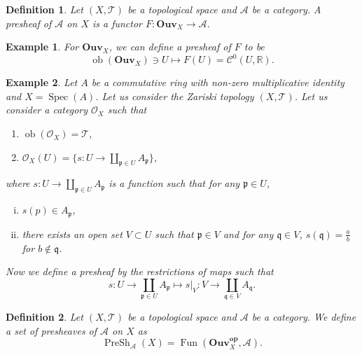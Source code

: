 \documentclass{article}
\newtheorem{definition}{Definition}[section]
\newtheorem{example}{Example}[section]
\numberwithin{equation}{section}
\DeclareMathOperator{\ob}{ob}
\DeclareMathOperator{\Spec}{Spec}
\DeclareMathOperator{\PreSh}{PreSh}
\DeclareMathOperator{\Fun}{Fun}
\begin{document}
\begin{definition}
Let $(X,\mathcal{T})$ be a topological space and $\mathcal{A}$ be a category. A presheaf of $\mathcal{A}$ on $X$ is a functor $F:\mathbf{Ouv}_X\to\mathcal{A}$.
\end{definition}

\begin{example}
For $\mathbf{Ouv}_X$, we can define a presheaf of $F$ to be
\begin{equation*}
\ob(\mathbf{Ouv}_X)\ni U\mapsto F(U) = \mathcal{C}^0(U,\mathbb{R}).
\end{equation*}
\end{example}

\begin{example}
Let $A$ be a commutative ring with non-zero multiplicative identity and $X=\Spec(A)$. Let us consider the Zariski topology $(X,\mathcal{T})$. Let us consider a category $\mathcal{O}_X$ such that
\begin{enumerate}[\textbullet]
\item $\ob(\mathcal{O}_X) = \mathcal{T}$,
\item $\mathcal{O}_X(U) =  \{s:U\to\coprod_{\mathfrak{p}\in U}A_{\mathfrak{p}}\}$,
\end{enumerate}
where $s:U\to\coprod_{\mathfrak{p}\in U}A_{\mathfrak{p}}$ is a function such that for any $\mathfrak{p}\in U$,
\begin{enumerate}[i).]
\item $s(p)\in A_{\mathfrak{p}}$,
\item there exists an open set $V\subset U$ such that $\mathfrak{p}\in V$ and for any $\mathfrak{q}\in V$,  $s(\mathfrak{q})={\frac a b}$ for $b\not\in\mathfrak{q}$. 
\end{enumerate}
Now we define a presheaf by the restrictions of maps such that
\begin{equation*}
s:U\to\coprod_{\mathfrak{p}\in U}A_{\mathfrak{p}} \mapsto s|_V:V\to\coprod_{\mathfrak{q}\in V} A_{\mathfrak{q}}.
\end{equation*}
\end{example}

\begin{definition}
Let $(X,\mathcal{T})$ be a topological space and $\mathcal{A}$ be a category. We define a set of presheaves of $\mathcal{A}$ on $X$ as
\begin{equation*}
\PreSh_{\mathcal{A}}(X)=\Fun(\mathbf{Ouv}_X^{\mathbf{op}},\mathcal{A}).
\end{equation*}
\end{definition}
\end{document}

